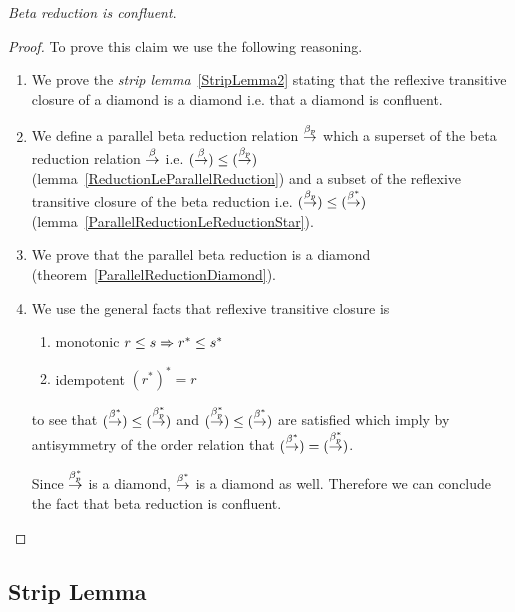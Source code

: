 \begin{theorem}
    \label{ChurchRosser}
    \emph{Beta reduction is confluent}.

    \begin{proof}
    To prove this claim we use the following reasoning.

    \begin{enumerate}

        \item We prove the \emph{strip lemma}~\ref{StripLemma2} stating that
        the reflexive transitive closure of a diamond is a diamond i.e. that a
        diamond is confluent.

        \item We define a parallel beta reduction relation $\stackrel{\beta_p}{\to}$ which a
        superset of the beta reduction relation $\stackrel{\beta}{\to}$ i.e.  $(\stackrel{\beta}{\to}) \le
        (\stackrel{\beta_p}{\to})$ (lemma~\ref{ReductionLeParallelReduction}) and a subset of
        the reflexive transitive closure of the beta reduction i.e. $(\stackrel{\beta_p}{\to})
        \le (\stackrel{\beta^*}{\to})$ (lemma~\ref{ParallelReductionLeReductionStar}).

        \item We prove that the parallel beta reduction is a diamond
        (theorem~\ref{ParallelReductionDiamond}).

        \item We use the general facts that reflexive transitive closure is
        \begin{enumerate}
            \item monotonic $r \le s \Rightarrow r^* \le s^*$

            \item idempotent $(r^*)^* = r$
        \end{enumerate}
        to see that $(\stackrel{\beta^*}{\to}) \le (\stackrel{\beta_p^*}{\to})$ and $(\stackrel{\beta_p^*}{\to}) \le
        (\stackrel{\beta^*}{\to})$ are satisfied which imply by antisymmetry of the order
        relation that $(\stackrel{\beta^*}{\to}) = (\stackrel{\beta_p^*}{\to})$.

        Since $\stackrel{\beta_p^*}{\to}$ is a diamond, $\stackrel{\beta^*}{\to}$ is a diamond as well.
        Therefore we can conclude the fact that beta reduction is confluent.
    \end{enumerate}
    \end{proof}
\end{theorem}





\subsection{Strip Lemma}

